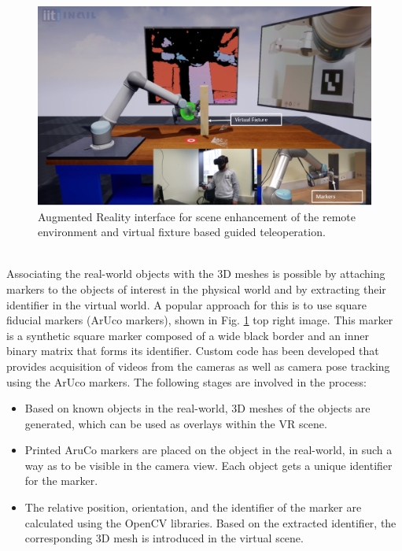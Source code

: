 \begin{figure}[h]
    \centering
    \includegraphics[scale=0.5]{images/AR_Marker.PNG}
    \caption{Augmented Reality  interface  for  scene enhancement of the remote environment and virtual fixture based guided teleoperation.}
    \label{fig:Aruco_AR}
\end{figure}\\

Associating the real-world objects with the 3D meshes is possible by attaching markers to the objects of  interest  in  the  physical  world  and  by  extracting  their  identifier  in  the virtual  world.  A  popular  approach  for  this  is  to  use  square  fiducial  markers  (ArUco  markers),  shown  in  Fig. \ref{fig:Aruco_AR} top right  image.  This  marker is a synthetic square marker composed of a wide black border and an inner binary matrix that forms its identifier. Custom code has been developed that provides acquisition of videos from the cameras as well as camera pose tracking using the ArUco markers. The following stages are involved in the process:

\begin{itemize}
    \item Based on known objects in the real-world, 3D meshes of the objects are generated, which can be used as overlays within the VR scene. 
    \item Printed AruCo markers are placed on the object in the real-world, in such a way as to be visible in the camera view. Each object gets a unique identifier for the marker.
    \item The  relative  position,  orientation,  and  the  identifier  of  the  marker  are  calculated  using  the  OpenCV libraries. Based on the extracted identifier, the corresponding 3D mesh is introduced in the virtual scene. 
\end{itemize}

